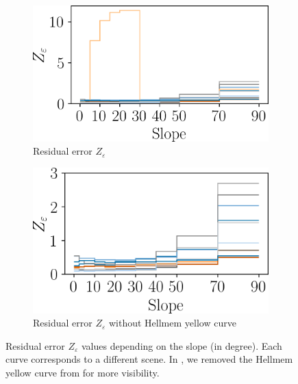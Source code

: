 \begin{figure}
    \begin{subfigure}[t]{0.495\linewidth}
        \flushleft
        \includegraphics[width=\linewidth]{Images/Chap_6/slope_eps.png}
        \caption{Residual error $Z_\varepsilon$}
        \label{fig:slope_eps_all}
    \end{subfigure}
    \begin{subfigure}[t]{0.495\linewidth}
        \flushright
        \includegraphics[width=\linewidth]{Images/Chap_6/slope_eps_no_Hellmem.png}
        \caption{Residual error $Z_\varepsilon$ without Hellmem yellow curve}
        \label{fig:slope_eps_no_hellmem}
    \end{subfigure}
    \caption{Residual error $Z_{\varepsilon}$ values depending on the slope (in degree). Each curve corresponds to a different scene. In , we removed the Hellmem yellow curve from  for more visibility.}
    \label{fig:slope_eps}
\end{figure}

